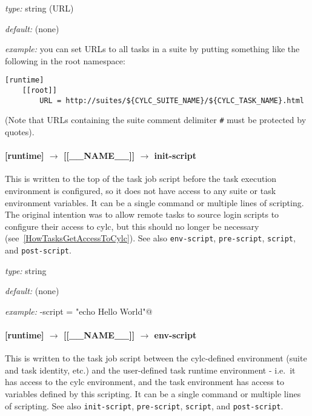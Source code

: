 \begin{myitemize}
\item {\em type:} string (URL)
\item {\em default:} (none)
\item {\em example:} you can set URLs to all tasks in a suite by putting
    something like the following in the root namespace:
    \begin{lstlisting}
[runtime]
    [[root]]
        URL = http://suites/${CYLC_SUITE_NAME}/${CYLC_TASK_NAME}.html
    \end{lstlisting}
\end{myitemize}

(Note that URLs containing the suite comment delimiter
\lstinline=#= must be protected by quotes).

\paragraph[init-script]{[runtime] $\rightarrow$ [[\_\_NAME\_\_]] $\rightarrow$ init-script}

This is written to the top of the task job script before the task execution
environment is configured, so it does not have access to any suite or task
environment variables. It can be a single command or multiple lines of
scripting. The original intention was to allow remote tasks to
source login scripts to configure their access to cylc, but this should no
longer be necessary (see~\ref{HowTasksGetAccessToCylc}). See also
\lstinline=env-script=, \lstinline=pre-script=, \lstinline=script=, and
\lstinline=post-script=.

\begin{myitemize}
\item {\em type:} string
\item {\em default:} (none)
\item {\em example:} \lstinline@init-script = "echo Hello World"@
\end{myitemize}

\paragraph[env-script]{[runtime] $\rightarrow$ [[\_\_NAME\_\_]] $\rightarrow$ env-script}

This is written to the task job script between the cylc-defined environment
(suite and task identity, etc.) and the user-defined task runtime environment -
i.e.\ it has access to the cylc environment, and the task environment has
access to variables defined by this scripting. It can be a single command or
multiple lines of scripting.  See also \lstinline=init-script=,
\lstinline=pre-script=, \lstinline=script=, and \lstinline=post-script=.

